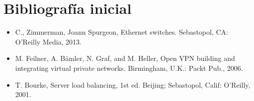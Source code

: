 \section {Bibliografía inicial}
\begin{itemize}
\item C., Zimmerman, Joann Spurgeon, Ethernet switches. Sebastopol, CA: O’Reilly Media, 2013.
\item M. Feilner, A. Bämler, N. Graf, and M. Heller, Open VPN building and integrating virtual private networks. Birmingham, U.K.: Packt Pub., 2006.
\item T. Bourke, Server load balancing, 1st ed. Beijing; Sebastopol, Calif: O’Reilly, 2001.
\end{itemize}
